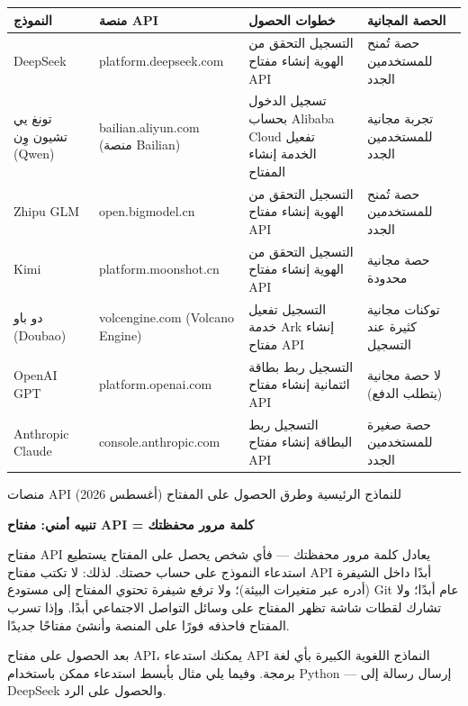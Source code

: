 \begin{center}
\begin{tabularx}{\linewidth}{|X|X|X|X|}
\hline
\textbf{النموذج} & \textbf{منصة API} & \textbf{خطوات الحصول} & \textbf{الحصة المجانية} \tabularnewline
\hline
DeepSeek & platform.deepseek.com & التسجيل التحقق من الهوية إنشاء مفتاح API & حصة تُمنح للمستخدمين الجدد \tabularnewline
تونغ يي تشيون وِن (Qwen) & bailian.aliyun.com (منصة Bailian) & تسجيل الدخول بحساب Alibaba Cloud تفعيل الخدمة إنشاء المفتاح & تجربة مجانية للمستخدمين الجدد \tabularnewline
Zhipu GLM & open.bigmodel.cn & التسجيل التحقق من الهوية إنشاء مفتاح API & حصة تُمنح للمستخدمين الجدد \tabularnewline
Kimi & platform.moonshot.cn & التسجيل التحقق من الهوية إنشاء مفتاح API & حصة مجانية محدودة \tabularnewline
دو باو (Doubao) & volcengine.com (Volcano Engine) & التسجيل تفعيل خدمة Ark إنشاء مفتاح API & توكنات مجانية كثيرة عند التسجيل \tabularnewline
OpenAI GPT & platform.openai.com & التسجيل ربط بطاقة ائتمانية إنشاء مفتاح API & لا حصة مجانية (يتطلب الدفع) \tabularnewline
Anthropic Claude & console.anthropic.com & التسجيل ربط البطاقة إنشاء مفتاح API & حصة صغيرة للمستخدمين الجدد \tabularnewline
\hline
\end{tabularx}
\end{center}

\begin{center}\small\color{gray}منصات API للنماذج الرئيسية وطرق الحصول على المفتاح (أغسطس 2026)\end{center}

\textbf{تنبيه أمني: مفتاح API = كلمة مرور محفظتك}\par

مفتاح API يعادل كلمة مرور محفظتك — فأي شخص يحصل على المفتاح يستطيع استدعاء النموذج على حساب حصتك. لذلك: لا تكتب مفتاح API أبدًا داخل الشيفرة (أدره عبر متغيرات البيئة)؛ ولا ترفع شيفرة تحتوي المفتاح إلى مستودع Git عام أبدًا؛ ولا تشارك لقطات شاشة تظهر المفتاح على وسائل التواصل الاجتماعي أبدًا. وإذا تسرب المفتاح فاحذفه فورًا على المنصة وأنشئ مفتاحًا جديدًا.


بعد الحصول على مفتاح API، يمكنك استدعاء API النماذج اللغوية الكبيرة بأي لغة برمجة. وفيما يلي مثال بأبسط استدعاء ممكن باستخدام Python — إرسال رسالة إلى DeepSeek والحصول على الرد.

